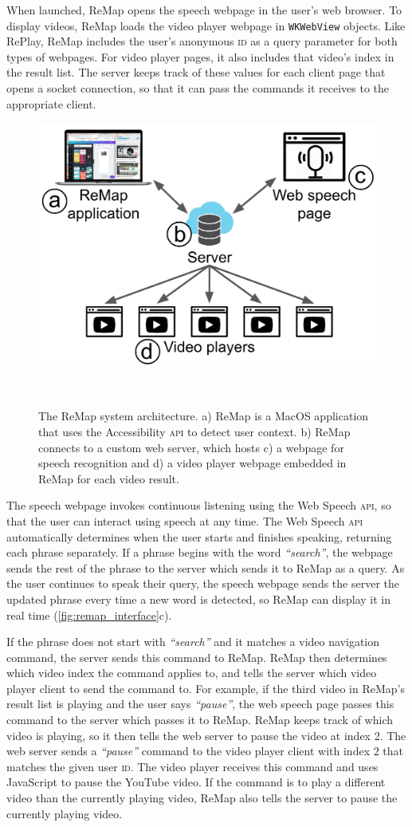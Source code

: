 When launched, ReMap opens the speech webpage in the user's web browser. To display videos, ReMap loads the video player webpage in \texttt{WKWebView} objects. 
Like RePlay, ReMap includes the user's anonymous \textsc{id} as a query parameter for both types of webpages. For video player pages, it also includes that video's index in the result list. The server keeps track of these values for each client page that opens a socket connection, so that it can pass the commands it receives to the appropriate client.

\begin{figure}[b!]
\centering
  \includegraphics[width=.7\textwidth]{remap/figures/system.png}
  \caption{The ReMap system architecture. a) ReMap is a MacOS application that uses the Accessibility \textsc{api} to detect user context. b) ReMap connects to a custom web server, which hosts c) a webpage for speech recognition and d) a video player webpage embedded in ReMap for each video result.}~\label{fig:remap_system}
\end{figure}

The speech webpage invokes continuous listening using the Web Speech \textsc{api}, so that the user can interact using speech at any time. 
The Web Speech \textsc{api} automatically determines when the user starts and finishes speaking, returning each phrase separately. If a phrase begins with the word \textit{``search''}, the webpage sends the rest of the phrase to the server which sends it to ReMap as a query. As the user continues to speak their query, the speech webpage sends the server the updated phrase every time a new word is detected, so ReMap can display it in real time (\autoref{fig:remap_interface}c).

If the phrase does not start with \textit{``search''} and it matches a video navigation command, the server sends this command to ReMap. ReMap then determines which video index the command applies to, and tells the server which video player client to send the command to. For example, if the third video in ReMap's result list is playing and the user says \textit{``pause''}, the web speech page passes this command to the server which passes it to ReMap. ReMap keeps track of which video is playing, so it then tells the web server to pause the video at index 2. The web server sends a \textit{``pause''} command to the video player client with index 2 that matches the given user \textsc{id}. The video player receives this command and uses JavaScript to pause the YouTube video. If the command is to play a different video than the currently playing video, ReMap also tells the server to pause the currently playing video. 


